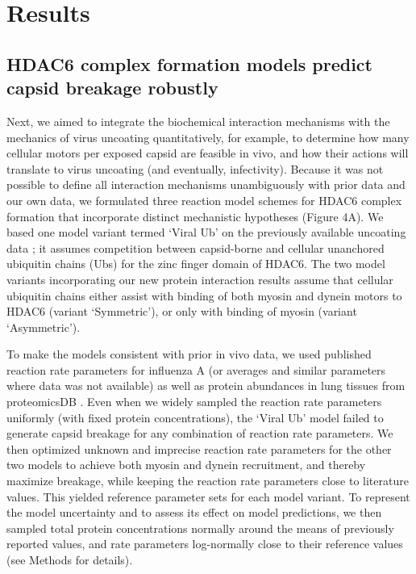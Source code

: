 \section{Results}

\subsection{HDAC6 complex formation models predict capsid breakage robustly}

Next, we aimed to integrate the biochemical interaction mechanisms with the mechanics of virus uncoating quantitatively, for example, to determine how many cellular motors per exposed capsid are feasible in vivo, and how their actions will translate to virus uncoating (and eventually, infectivity). Because it was not possible to define all interaction mechanisms unambiguously with prior data and our own data, we formulated three reaction model schemes for HDAC6 complex formation that incorporate distinct mechanistic hypotheses (Figure 4A). We based one model variant termed ‘Viral Ub’ on the previously available uncoating data \cite{banerjee2014influenza}; it assumes competition between capsid-borne and cellular unanchored ubiquitin chains (Ubs) for the zinc finger domain of HDAC6. The two model variants incorporating our new protein interaction results assume that cellular ubiquitin chains either assist with binding of both myosin and dynein motors to HDAC6 (variant ‘Symmetric’), or only with binding of myosin (variant ‘Asymmetric’).

To make the models consistent with prior in vivo data, we used published reaction rate parameters for influenza A (or averages and similar parameters where data was not available) as well as protein abundances in lung tissues from proteomicsDB \cite{schmidt2018proteomicsdb}. Even when we widely sampled the reaction rate parameters uniformly (with fixed protein concentrations), the ‘Viral Ub’ model failed to generate capsid breakage for any combination of reaction rate parameters. We then optimized unknown and imprecise reaction rate parameters for the other two models to achieve both myosin and dynein recruitment, and thereby maximize breakage, while keeping the reaction rate parameters close to literature values. This yielded reference parameter sets for each model variant. To represent the model uncertainty and to assess its effect on model predictions, we then sampled total protein concentrations normally around the means of previously reported values, and rate parameters log-normally close to their reference values (see Methods for details).

